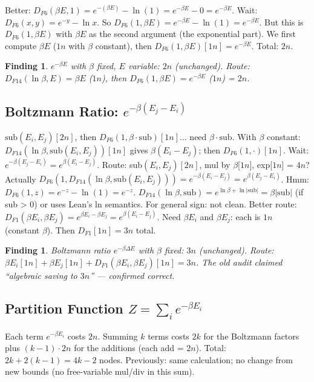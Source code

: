 \documentclass[11pt]{article}
\newtheorem{finding}[theorem]{Finding}
\newcommand{\ok}[1]{\textcolor{ok}{#1}}
\begin{document}
Better: $D_{F6}(\beta E, 1) = e^{-(\beta E)} - \ln(1) = e^{-\beta E} - 0 = e^{-\beta E}$.
Wait: $D_{F6}(x,y) = e^{-y} - \ln x$. So $D_{F6}(1, \beta E) = e^{-\beta E} - \ln(1) = e^{-\beta E}$.
But this is $D_{F6}(1, \beta E)$ with $\beta E$ as the second argument (the exponential part).
We first compute $\beta E$ ($1n$ with $\beta$ constant), then $D_{F6}(1, \beta E)[1n] = e^{-\beta E}$. Total: $2n$.

\begin{finding}
$e^{-\beta E}$ with $\beta$ fixed, $E$ variable: \ok{$2n$ (unchanged)}.
Route: $D_{F14}(\ln\beta, E) = \beta E$ ($1n$), then $D_{F6}(1, \beta E) = e^{-\beta E}$ ($1n$) = $2n$.
\end{finding}

\subsection{Boltzmann Ratio: $e^{-\beta(E_j-E_i)}$}

$\mathrm{sub}(E_i, E_j)[2n]$, then $D_{F6}(1, \beta \cdot \mathrm{sub})[1n]$... need $\beta \cdot \mathrm{sub}$.
With $\beta$ constant: $D_{F14}(\ln\beta, \mathrm{sub}(E_i,E_j))[1n]$ gives $\beta(E_i-E_j)$; then $D_{F6}(1, \cdot)[1n]$.
Wait: $e^{-\beta(E_j-E_i)} = e^{\beta(E_i-E_j)}$. Route: sub$(E_i,E_j)[2n]$, mul by $\beta$[$1n$], exp[$1n$] = $4n$?
Actually $D_{F6}(1, D_{F14}(\ln\beta, \mathrm{sub}(E_i,E_j))) = e^{-\beta(E_i-E_j)} = e^{\beta(E_j-E_i)}$.
Hmm: $D_{F6}(1, z) = e^{-z} - \ln(1) = e^{-z}$.
$D_{F14}(\ln\beta, \mathrm{sub}) = e^{\ln\beta + \ln|\mathrm{sub}|} = \beta |\mathrm{sub}|$ (if sub > 0) or uses Lean's ln semantics.
For general sign: not clean. Better route: $D_{F1}(\beta E_i, \beta E_j) = e^{\beta E_i - \beta E_j} = e^{\beta(E_i-E_j)}$.
Need $\beta E_i$ and $\beta E_j$: each is $1n$ (constant $\beta$). Then $D_{F1}[1n] = 3n$ total.

\begin{finding}
Boltzmann ratio $e^{-\beta\Delta E}$ with $\beta$ fixed: \ok{$3n$ (unchanged)}.
Route: $\beta E_i[1n] + \beta E_j[1n] + D_{F1}(\beta E_i, \beta E_j)[1n] = 3n$.
The old audit claimed ``algebraic saving to $3n$'' --- confirmed correct.
\end{finding}

\subsection{Partition Function $Z = \sum_i e^{-\beta E_i}$}

Each term $e^{-\beta E_i}$ costs $2n$. Summing $k$ terms costs $2k$ for the Boltzmann factors
plus $(k-1) \cdot 2n$ for the additions (each add = $2n$). Total: $2k + 2(k-1) = 4k-2$ nodes.
Previously: same calculation; no change from new bounds (no free-variable mul/div in this sum).
\end{document}
